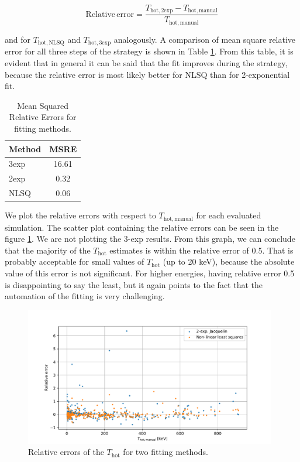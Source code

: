 \begin{equation}
	\mathrm{Relative \, error} = \frac{T_\mathrm{hot,2exp}-T_\mathrm{hot,manual}}{T_\mathrm{hot,manual}}
\end{equation}

and for $T_\mathrm{hot,NLSQ}$ and $T_\mathrm{hot,3exp}$ analogously. A comparison of mean square relative error for all three steps of the strategy is shown in Table \ref{tab:means_mses}. From this table, it is evident that in general it can be said that the fit improves during the strategy, because the relative error is most likely better for NLSQ than for 2-exponential fit.  

\begin{table}[ht]
	\centering
	\begin{tabular}{lc}
		\toprule
		Method & MSRE \\
		\midrule
		3exp  & 16.61 \\
		2exp  & 0.32 \\
		NLSQ & 0.06 \\
		\bottomrule
	\end{tabular}
	\caption{Mean Squared Relative Errors for fitting methods.}
	\label{tab:means_mses}
\end{table}


We plot the relative errors with respect to $T_\mathrm{hot,manual}$ for each evaluated simulation. The scatter plot containing the relative errors can be seen in the figure \ref{fig:relative-errors}. We are not plotting the 3-exp results. From this graph, we can conclude that the majority of the $T_\mathrm{hot}$ estimates is within the relative error of 0.5. That is probably acceptable for small values of $T_\mathrm{hot}$ (up to 20 keV), because the absolute value of this error is not significant. For higher energies, having relative error 0.5 is disappointing to say the least, but it again points to the fact that the automation of the fitting is very challenging.

\begin{figure}[ht]
	\centering
	\includegraphics[width=0.98\textwidth]{figures/relative-error}
	\caption{Relative errors of the $T_\mathrm{hot}$ for two fitting methods.}
	\label{fig:relative-errors}
\end{figure}


